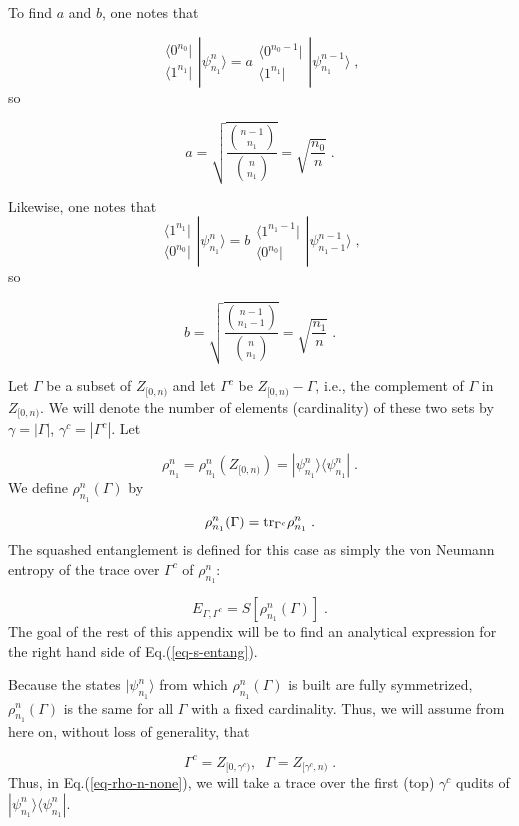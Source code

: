 \documentclass[12pt]{article}%
\newcommand{\qed}[0]{\newline\noindent{\bf QED }}
\newcommand{\bra}[1]{\langle#1|}
\newcommand{\ket}[1]{|#1\rangle}
\newcommand{\tr}[0]{{\rm tr }}
\newcommand{\beq}{\begin{equation}}
\newcommand{\eeq}{\end{equation}}
\newcommand{\brazo}{ \begin{array}{r}
 \bra{0^{n_0}}
 \\
 \bra{1^{n_1}}
 \end{array}
 }
\begin{document}
{ To find $a$ and $b$, one notes that

 \beq
 \brazo \ket{\psi^n_{n_1}}
 =
 a
 \begin{array}{r}
  \bra{0^{n_0-1}}
 \\
 \bra{1^{n_1}}
 \end{array}
  \ket{\psi^{n-1}_{n_1}}
 \;,
 \eeq
 so

 \beq
 a = \sqrt{\frac{{n-1\choose n_1}}{{n\choose n_1}}}
=
 \sqrt{\frac{n_0}{n}}
 \;.
 \eeq

Likewise, one notes that
 \beq
  \begin{array}{r}
  \bra{1^{n_1}}
 \\
 \bra{0^{n_0}}
 \end{array}
 \ket{\psi^n_{n_1}}
 =
 b
 \begin{array}{r}
  \bra{1^{n_1-1}}
 \\
 \bra{0^{n_0}}
 \end{array}
  \ket{\psi^{n-1}_{n_1-1}}
 \;,
 \eeq
 so

 \beq
 b = \sqrt{\frac{{n-1\choose n_1-1}}{{n\choose n_1}}}
=
 \sqrt{\frac{n_1}{n}}
 \;.
 \eeq
 \qed

Let  $\Gamma$ be a subset of
$ Z_{[0,n)}$ and let $\Gamma^c$ be
$Z_{[0,n)}-\Gamma$, i.e.,  the complement
 of
$\Gamma$ in
$ Z_{[0,n)}$.
We will denote the number of elements
(cardinality) of these two sets by
$\gamma = |\Gamma|$,
$\gamma^c = |\Gamma^c|$.
Let

\beq
\rho^n_{n_1}= \rho^n_{n_1}(Z_{[0,n)})
=
\ket{\psi^n_{n_1}}
\bra{\psi^n_{n_1}}
\;.
\eeq
We define $\rho^n_{n_1}(\Gamma)$ by

\beq
\rho^n_{n_1}(\Gamma) =
\tr_{\Gamma^c}
\rho^n_{n_1}
\;.\label{eq-rho-n-none}
\eeq
The squashed entanglement is defined
for this case as simply the von Neumann entropy
of the trace over $\Gamma^c$ of $\rho^n_{n_1}$:

\beq
E_{\Gamma, \Gamma^c} = S[\rho^n_{n_1}(\Gamma)]
\;.
\label{eq-s-entang}
\eeq
The goal of the rest of this appendix will
be to find an analytical expression for the
right hand side of Eq.(\ref{eq-s-entang}).

Because the states
$\ket{\psi^n_{n_1}}$ from which
$\rho^n_{n_1}(\Gamma)$  is built are fully symmetrized,
$\rho^n_{n_1}(\Gamma)$ is the same for all $\Gamma$
with a fixed cardinality.
Thus,
we will assume from here on, without loss of generality, that


\beq
\Gamma^c = Z_{[0, \gamma^c)},\;\;
\Gamma = Z_{[\gamma^c, n)}
\;.
\eeq
Thus,
in Eq.(\ref{eq-rho-n-none}), we will take a
trace over the first (top) $\gamma^c$
qudits of $\ket{\psi^n_{n_1}}
\bra{\psi^n_{n_1}}$.

}
\end{document}
